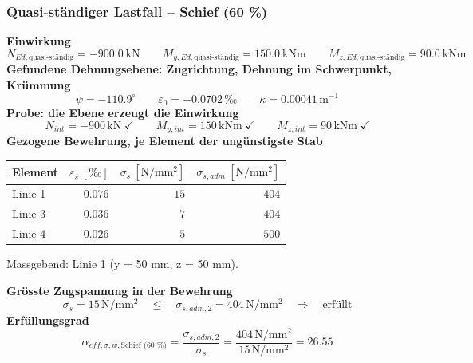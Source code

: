 \documentclass[11pt,a4paper]{article}
\begin{document}
\subsubsection{Quasi-ständiger Lastfall – Schief (60 \%)}
\noindent\textbf{Einwirkung}
\begin{equation*}
N_{Ed,\text{quasi-ständig}} = -900.0\ \mathrm{kN} \qquad M_{y,Ed,\text{quasi-ständig}} = 150.0\ \mathrm{kNm} \qquad M_{z,Ed,\text{quasi-ständig}} = 90.0\ \mathrm{kNm}
\end{equation*}
\noindent\textbf{Gefundene Dehnungsebene: Zugrichtung, Dehnung im Schwerpunkt, Krümmung}
\begin{equation*}
\psi = -110.9^\circ \qquad \varepsilon_0 = -0.0702\,\text{‰} \qquad \kappa = 0.00041\,\mathrm{m}^{-1}
\end{equation*}
\noindent\textbf{Probe: die Ebene erzeugt die Einwirkung}
\begin{equation*}
N_{int} = -900\,\mathrm{kN} \;\checkmark \qquad M_{y,int} = 150\,\mathrm{kNm} \;\checkmark \qquad M_{z,int} = 90\,\mathrm{kNm} \;\checkmark
\end{equation*}
\noindent\textbf{Gezogene Bewehrung, je Element der ungünstigste Stab}
\begin{longtable}{lrrr}
\hline
Element & $\varepsilon_s\ [‰]$ & $\sigma_s\ [\mathrm{N/mm^2}]$ & $\sigma_{s,adm}\ [\mathrm{N/mm^2}]$ \\
\hline
\endhead
Linie 1 & $0.076$ & $15$ & $404$ \\
Linie 3 & $0.036$ & $7$ & $404$ \\
Linie 4 & $0.026$ & $5$ & $500$ \\
\hline
\end{longtable}
Massgebend: Linie 1 (y = 50 mm, z = 50 mm).

\noindent\textbf{Grösste Zugspannung in der Bewehrung}
\begin{equation*}
\sigma_s = 15\,\mathrm{N}/\mathrm{mm}^{2} \quad \le \quad \sigma_{s,adm,2} = 404\,\mathrm{N}/\mathrm{mm}^{2} \quad \Rightarrow \quad \text{erfüllt}
\end{equation*}
\noindent\textbf{Erfüllungsgrad}
\begin{equation*}
\alpha_{eff,\sigma,w,\text{Schief (60 \%)}} = \frac{\sigma_{s,adm,2}}{\sigma_s} = \frac{404\,\mathrm{N}/\mathrm{mm}^{2}}{15\,\mathrm{N}/\mathrm{mm}^{2}} = 26.55
\end{equation*}
\end{document}
